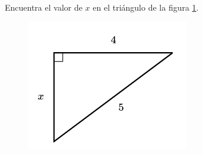 Encuentra el valor de $x$ en el triángulo de la figura \ref{fig:lados_pitagoras_24}.

\begin{minipage}[t][][t]{0.35\textwidth}
    \begin{figure}[H]
        \centering
        \includegraphics[width=0.9\linewidth]{../images/lados_pitagoras_24.png}

        \caption{}
        \label{fig:lados_pitagoras_24}
    \end{figure}
\end{minipage}\hfill
